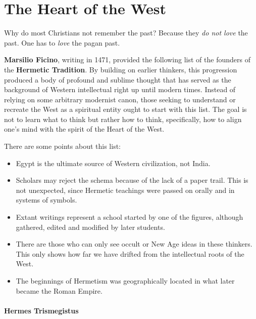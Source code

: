\section{The Heart of the West}

\label{sec:HeartWest}

\begin{quotex}
Why do most Christians not remember the past? Because they \emph{do not love} the past. One has to \emph{love} the pagan past.
\end{quotex}


\textbf{Marsilio Ficino}, writing in 1471, provided the following list of the founders of the \textbf{Hermetic Tradition}. By building on earlier thinkers, this progression produced a body of profound and sublime thought that has served as the background of Western intellectual right up until modern times. Instead of relying on some arbitrary modernist canon, those seeking to understand or recreate the West as a spiritual entity ought to start with this list. The goal is not to learn what to think but rather how to think, specifically, how to align one's mind with the spirit of the Heart of the West.

There are some points about this list:

\begin{itemize}


\item Egypt is the ultimate source of Western civilization, not India.

\item Scholars may reject the schema because of the lack of a paper trail. This is not unexpected, since Hermetic teachings were passed on orally and in systems of symbols.

\item Extant writings represent a school started by one of the figures, although gathered, edited and modified by later students.

\item There are those who can only see occult or New Age ideas in these thinkers. This only shows how far we have drifted from the intellectual roots of the West.

\item The beginnings of Hermetism was geographically located in what later became the Roman Empire.
\end{itemize}


\paragraph{Hermes Trismegistus}


